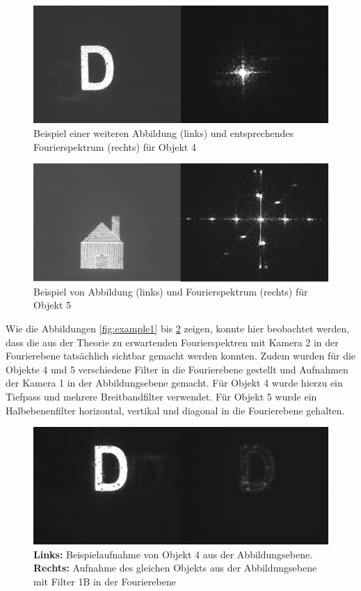 \begin{figure}
\centering
\includegraphics[width=0.7\linewidth]{images/example9.png}
\caption{Beispiel einer weiteren Abbildung (links) und entsprechendes Fourierspektrum (rechts) für Objekt 4}
\label{fig:example9}
\end{figure}

\begin{figure}
\centering
\includegraphics[width=0.7\linewidth]{images/example16.png}
\caption{Beispiel von Abbildung (links) und Fourierspektrum (rechts) für Objekt 5}
\label{fig:example16}
\end{figure}


Wie die Abbildungen \ref{fig:example1} bis \ref{fig:example16} zeigen, konnte hier beobachtet werden, dass die aus der Theorie zu erwartenden Fourierspektren mit Kamera 2 in der Fourierebene tatsächlich sichtbar gemacht werden konnten. 
Zudem wurden für die Objekte 4 und 5 verschiedene Filter in die Fourierebene gestellt und Aufnahmen der Kamera 1 in der Abbildungsebene gemacht. Für Objekt 4 wurde hierzu ein Tiefpass und mehrere Breitbandfilter verwendet. Für Objekt 5 wurde ein Halbebenenfilter horizontal, vertikal und diagonal in die Fourierebene gehalten. \\

\begin{figure}
	\centering
	\includegraphics[width=0.7\linewidth]{images/example10_Filter1B.png}
	\caption{
		\textbf{Links:} Beispielaufnahme von Objekt 4 aus der Abbildungsebene.\\
		\textbf{Rechts:} Aufnahme des gleichen Objekts aus der Abbildungsebene mit Filter 1B in der Fourierebene}
	\label{fig:example10_Filter1B}
\end{figure}


